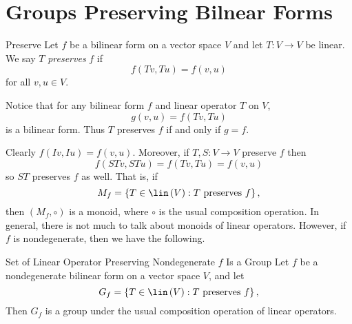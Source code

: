 \documentclass[linearalgebra]{subfiles}
\begin{document}
    \section{Groups Preserving Bilnear Forms}

    \begin{definition}{Preserve}{}
        Let $f$ be a bilinear form on a vector space $V$ and let $T:V\to V$ be linear. We say $T$ \emph{preserves} $f$ if
        \begin{equation*}
            f\left( Tv, Tu \right) = f\left( v,u \right) 
        \end{equation*}
        for all $v,u\in V$.
    \end{definition}

    \begin{remark}
        Notice that for any bilinear form $f$ and linear operator $T$ on $V$,
        \begin{equation*}
            g\left( v,u \right) = f\left( Tv, Tu \right) 
        \end{equation*}
        is a bilinear form. Thus $T$ preserves $f$ if and only if $g=f$.
    \end{remark}

    \begin{remark}
        Clearly $f\left( Iv, Iu \right) = f\left( v,u \right)$. Moreover, if $T,S:V\to V$ preserve $f$ then
        \begin{equation*}
            f\left( STv, STu \right) = f\left( Tv, Tu \right) = f\left( v, u \right) 
        \end{equation*}
        so $ST$ preserves $f$ as well. That is, if
        \begin{equation*}
            M_f = \left\lbrace T\in\lin\left( V \right) : T\text{ preserves }f \right\rbrace,
        \end{equation*}
        then $\left( M_f, \circ \right)$ is a monoid, where $\circ$ is the usual composition operation. In general, there is not much to talk about monoids of linear operators. However, if $f$ is nondegenerate, then we have the following.
    \end{remark}

    \begin{prop}{Set of Linear Operator Preserving Nondegenerate $f$ Is a Group}
        Let $f$ be a nondegenerate bilinear form on a vector space $V$, and let
        \begin{equation*}
            G_f = \left\lbrace T\in\lin\left( V \right) : T\text{ preserves }f \right\rbrace,
        \end{equation*}
        Then $G_f$ is a group under the usual composition operation of linear operators.
    \end{prop}
\end{document}
